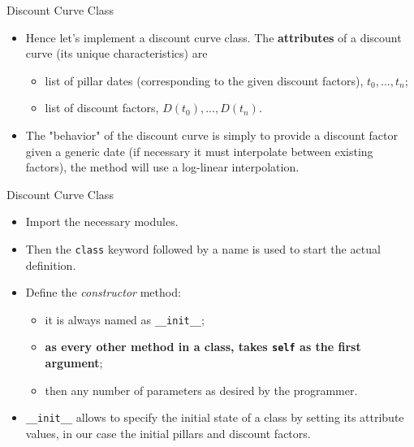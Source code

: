 \documentclass{beamer}
\begin{document}
\begin{frame}{Discount Curve Class}
  \begin{itemize}
  \item Hence let's implement a discount curve class. The \textbf{attributes} of a discount curve (its unique characteristics) are
      \begin{itemize}
      \item list of pillar dates (corresponding to the given discount factors), $t_0,...,t_{n}$;
      \item list of discount factors, $D(t_0),...,D(t_{n})$.
      \end{itemize}
  \item The "behavior" of the discount curve is simply to provide a discount factor given a generic date (if necessary it must interpolate between existing factors), the method will use a log-linear interpolation.
  \end{itemize}
\end{frame}
      
\begin{frame}{Discount Curve Class}
\begin{itemize}
  \item Import the necessary modules.
  \item Then the \texttt{class} keyword followed by a name is used to start the actual definition.
  \item Define the \emph{constructor} method:
    \begin{itemize}
    \item it is always named as \texttt{\_\_init\_\_};
    \item \textbf{as every other method in a class, takes \texttt{self} as the first argument};
    \item then any number of parameters as desired by the programmer.
    \end{itemize}
  \item \texttt{\_\_init\_\_} allows to specify the initial state of a class by setting its attribute values, in our case the initial pillars and discount factors.
  \end{itemize}
\end{frame}
\end{document}

